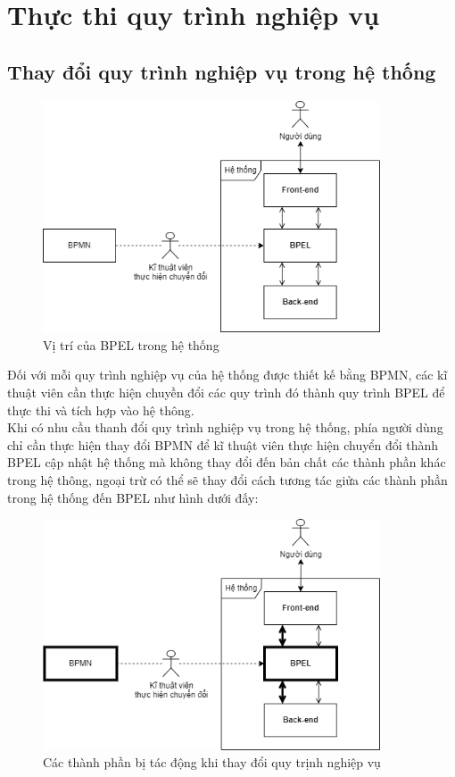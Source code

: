 \section{Thực thi quy trình nghiệp vụ}

\subsection{Thay đổi quy trình nghiệp vụ trong hệ thống}
\begin{figure}[!htp]
    \centering
    \includegraphics[width=10cm]{img/bpel/general.png}
    \newline
    \caption{Vị trí của BPEL trong hệ thống}
\end{figure}

Đối với mỗi quy trình nghiệp vụ của hệ thống được thiết kế bằng BPMN, các kĩ thuật viên cần thực hiện chuyền đổi các quy trình đó thành quy trình BPEL để thực thi và tích hợp vào hệ thông. \\

Khi có nhu cầu thanh đổi quy trình nghiệp vụ trong hệ thống, phía người dùng chỉ cần thực hiện thay đổi BPMN để kĩ thuật viên thực hiện chuyển đổi thành BPEL cập nhật hệ thống mà không thay đổi đến bản chất các thành phần khác trong hệ thông, ngoại trừ có thể sẽ thay đổi cách tương tác giửa các thành phần trong hệ thống đến BPEL như hình dưới đấy:

\begin{figure}[!htp]
    \centering
    \includegraphics[width=10cm]{img/bpel/tranfer.png}
    \newline
    \caption{Các thành phần bị tác động khi thay đổi quy trịnh nghiệp vụ}
\end{figure}





